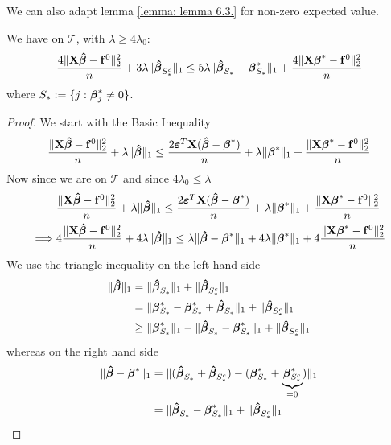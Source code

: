 We can also adapt lemma \ref{lemma: lemma 6.3.} for non-zero expected value.
\begin{lemma}
    We have on \(\mathscr{T}\), with \(\lambda \geq 4 \lambda_{0}\):
    \begin{equation}
        \label{eqn: new version of lemma 6.3.}
        \frac{4 \|\mathbf{X} \boldsymbol{\hat{\beta}}-\mathbf{f}^0\|_{2}^{2}}{n} + 3 \lambda \| \boldsymbol{\hat{\beta}}_{S^{c}_{*}} \|_{1} \leq 5 \lambda \| \boldsymbol{\hat{\beta}}_{S_{*}} - \boldsymbol{\beta}_{S_{*}}^{*} \|_{1} + \frac{4 \|\mathbf{X} \boldsymbol{\beta}^{*} - \mathbf{f}^{0} \|_{2}^{2}}{n}
    \end{equation}
    where $S_* := \{ j: \boldsymbol{\beta}_j^* \neq 0 \}$.
\end{lemma}
\begin{proof}
    We start with the Basic Inequality
    $$
        \frac{\|\mathbf{X} \boldsymbol{\hat{\beta}} - \mathbf{f}^0 \|_{2}^{2}}{n} + \lambda\| \boldsymbol{\hat{\beta}} \|_{1} \leq  \frac{2 \boldsymbol{\varepsilon}^T \mathbf{X} (\boldsymbol{\hat{\beta}} - \boldsymbol{\beta}^*)}{n} + \lambda \| \boldsymbol{\beta}^*\|_{1} + \frac{\|\mathbf{X} \boldsymbol{\beta}^* - \mathbf{f}^0\|_{2}^{2}}{n}
    $$
    Now since we are on $\mathscr{T}$ and since $4 \lambda_0 \leq \lambda$
    \begin{align*}
                 & \frac{\|\mathbf{X} \boldsymbol{\hat{\beta}} - \mathbf{f}^0 \|_{2}^{2}}{n} + \lambda\| \boldsymbol{\hat{\beta}} \|_{1} \leq  \frac{2 \boldsymbol{\varepsilon}^T \mathbf{X} (\boldsymbol{\hat{\beta}} - \boldsymbol{\beta}^*)}{n} + \lambda \| \boldsymbol{\beta}^*\|_{1} + \frac{\|\mathbf{X} \boldsymbol{\beta}^* - \mathbf{f}^0\|_{2}^{2}}{n} \\
        \implies &
        4 \frac{\| \mathbf{X} \boldsymbol{\hat{\beta}} - \mathbf{f}^0 \|_{2}^{2}}{n} + 4 \lambda\| \boldsymbol{\hat{\beta}} \|_{1} \leq \lambda \| \boldsymbol{\hat{\beta}} - \boldsymbol{\beta}^* \|_{1} + 4 \lambda \| \boldsymbol{\beta}^*\|_{1} + 4\frac{\|\mathbf{X} \boldsymbol{\beta}^* - \mathbf{f}^0\|_{2}^{2}}{n}           \\
    \end{align*}
    We use the triangle inequality on the left hand side
    \begin{align*}
        \|\boldsymbol{\hat{\beta}}\|_{1}
         & = \|\boldsymbol{\hat{\beta}}_{S_{*}} \|_{1} + \|\boldsymbol{\hat{\beta}}_{S_{*}^{c}} \|_{1}                                                \\
         & = \|\boldsymbol{\beta}_{S_{*}}^{*} - \boldsymbol{\beta}_{S_{*}}^{*} + \boldsymbol{\hat{\beta}}_{S_{*}} \|_{1} + \|\boldsymbol{\hat{\beta}}_{S_{*}^{c}} \|_{1}          \\
         & \geq \|\boldsymbol{\beta}_{S_{*}}^{*} \|_{1} - \|\boldsymbol{\hat{\beta}}_{S_{*}}-\boldsymbol{\beta}_{S_{*}}^{*} \|_{1}+ \|\boldsymbol{\hat{\beta}}_{S_{*}^{c}} \|_{1}
    \end{align*}
    whereas on the right hand side
    \begin{align*}
        \|\btahat-\bta^{*} \|_{1}
         & =  \| (\btahat_{S_{*}} + \btahat_{S_{*}^{c}}) - (\bta_{S_{*}}^{*} + \underbrace{\bta_{S_{*}^{c}}^*}_{=0}) \|_{1} \\
         & =  \| \btahat_{S_{*}}-\bta_{S_{*}}^{*} \|_{1} + \|\btahat_{S_{*}^{c}} \|_{1}

\end{align*}
\end{proof}
